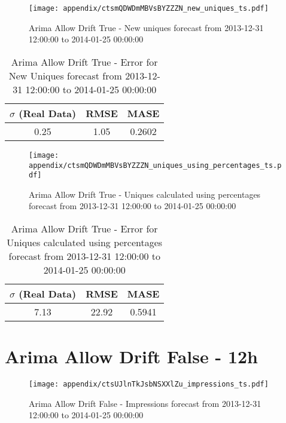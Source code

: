 \begin{figure}[H] \begin{center} \leavevmode
\texttt{[image: appendix/ctsmQDWDmMBVsBYZZZN\_new\_uniques\_ts.pdf]} \caption[]{
Arima Allow Drift True - New uniques forecast from 2013-12-31 12:00:00 to 2014-01-25 00:00:00} \label{fig:appendix/ctsmQDWDmMBVsBYZZZN_new_uniques_ts.pdf} \end{center}
\end{figure}

\begin{table}[H]
\centering
\footnotesize
\begin{tabular}{ccc}
$\sigma$ (Real Data) & RMSE & MASE   \\ \hline
0.25 & 1.05 & 0.2602 \\
\end{tabular}

\vspace{0.5cm}

\caption[]{
Arima Allow Drift True - Error for New Uniques forecast from 2013-12-31 12:00:00 to 2014-01-25 00:00:00}
\end{table}

\begin{figure}[H] \begin{center} \leavevmode
\texttt{[image: appendix/ctsmQDWDmMBVsBYZZZN\_uniques\_using\_percentages\_ts.pdf]} \caption[]{
Arima Allow Drift True - Uniques calculated using percentages forecast from 2013-12-31 12:00:00 to 2014-01-25 00:00:00} \label{fig:appendix/ctsmQDWDmMBVsBYZZZN_uniques_using_percentages_ts.pdf} \end{center}
\end{figure}

\begin{table}[H]
\centering
\footnotesize
\begin{tabular}{ccc}
$\sigma$ (Real Data) & RMSE & MASE   \\ \hline
7.13 & 22.92 & 0.5941 \\
\end{tabular}

\vspace{0.5cm}

\caption[]{
Arima Allow Drift True - Error for Uniques calculated using percentages forecast from 2013-12-31 12:00:00 to 2014-01-25 00:00:00}
\end{table}

\section{Arima Allow Drift False - 12h}
\begin{figure}[H] \begin{center} \leavevmode
\texttt{[image: appendix/ctsUJlnTkJsbNSXXlZu\_impressions\_ts.pdf]} \caption[]{
Arima Allow Drift False - Impressions forecast from 2013-12-31 12:00:00 to 2014-01-25 00:00:00} \label{fig:appendix/ctsUJlnTkJsbNSXXlZu_impressions_ts.pdf} \end{center}
\end{figure}


